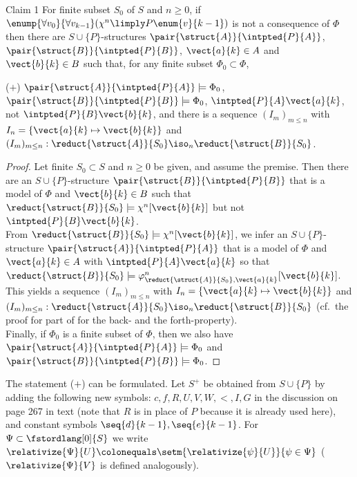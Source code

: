 \begin{enumerate}[1.]
\begin{theorem}{Claim 1}
For finite subset $S_0$ of $S$ and $n \geq 0$, if $\enump{\forall v_0}{\forall v_{k - 1}} (\chi^n \limply P\enum{v}{k - 1})$ is not a consequence of $\Phi$ then there are $S \cup \{ P \}$-structures $\pair{\struct{A}}{\intpted{P}{A}}$, $\pair{\struct{B}}{\intpted{P}{B}}$, $\vect{a}{k} \in A$ and $\vect{b}{k} \in B$ such that, for any finite subset $\Phi_0 \subset \Phi$,\smallskip\\
\begin{bquoteno}{68ex}{{\rm($+$)}}
$\pair{\struct{A}}{\intpted{P}{A}} \models \Phi_0$, $\pair{\struct{B}}{\intpted{P}{B}} \models \Phi_0$, $\intpted{P}{A}\vect{a}{k}$, not $\intpted{P}{B}\vect{b}{k}$, and there is a sequence $(I_m)_{m \leq n}$ with $I_n = \{ \vect{a}{k} \mapsto \vect{b}{k} \}$ and $(I_m)_{m \leq n}: \reduct{\struct{A}}{S_0} \iso_n \reduct{\struct{B}}{S_0}$.
\end{bquoteno}
\end{theorem}
\begin{proof}
Let finite $S_0 \subset S$ and $n \geq 0$ be given, and assume the premise. Then there are an $S \cup \{ P \}$-structure $\pair{\struct{B}}{\intpted{P}{B}}$ that is a model of $\Phi$ and $\vect{b}{k} \in B$ such that $\reduct{\struct{B}}{S_0} \models \chi^n [\vect{b}{k}]$ but not $\intpted{P}{B} \vect{b}{k}$.\bigskip\\
From $\reduct{\struct{B}}{S_0} \models \chi^n [\vect{b}{k}]$, we infer an $S \cup \{ P \}$-structure $\pair{\struct{A}}{\intpted{P}{A}}$ that is a model of $\Phi$ and $\vect{a}{k} \in A$ with $\intpted{P}{A}\vect{a}{k}$ so that $\reduct{\struct{B}}{S_0} \models \varphi^n_{\reduct{\struct{A}}{S_0}, \vect{a}{k}}[\vect{b}{k}]$. This yields a sequence $(I_m)_{m \leq n}$ with $I_n = \{ \vect{a}{k} \mapsto \vect{b}{k} \}$ and $(I_m)_{m \leq n}: \reduct{\struct{A}}{S_0} \iso_n \reduct{\struct{B}}{S_0}$ (cf.\ the proof for part  of  for the back- and the forth-property).\bigskip\\
Finally, if $\Phi_0$ is a finite subset of $\Phi$, then we also have $\pair{\struct{A}}{\intpted{P}{A}} \models \Phi_0$ and $\pair{\struct{B}}{\intpted{P}{B}} \models \Phi_0$.
\end{proof}
The statement ($+$) can be formulated. Let $S^+$ be obtained from $S \cup \{ P \}$ by adding the following new symbols: $c, f, R, U, V, W, <, I, G$ in the discussion on page 267 in text (note that $R$ is in place of $P$ because it is already used here), and constant symbols $\seq{d}{k - 1}, \seq{e}{k - 1}$. For $\Psi \subset \fstordlang[0]{S}$ we write $\relativize{\Psi}{U} \colonequals \setm{\relativize{\psi}{U}}{\psi \in \Psi}$ ($\relativize{\Psi}{V}$ is defined analogously).\bigskip\\

\end{enumerate}
